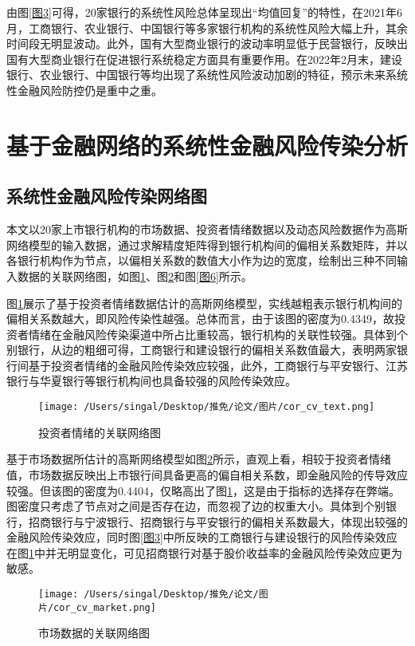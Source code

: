 \documentclass[lang=cn]{elegantpaper}
\begin{document}
由图\ref{图3}可得，20家银行的系统性风险总体呈现出“均值回复”的特性，在2021年6月，工商银行、农业银行、中国银行等多家银行机构的系统性风险大幅上升，其余时间段无明显波动。此外，国有大型商业银行的波动率明显低于民营银行，反映出国有大型商业银行在促进银行系统稳定方面具有重要作用。在2022年2月末，建设银行、农业银行、中国银行等均出现了系统性风险波动加剧的特征，预示未来系统性金融风险防控仍是重中之重。

\section{基于金融网络的系统性金融风险传染分析}
\subsection{系统性金融风险传染网络图}
本文以20家上市银行机构的市场数据、投资者情绪数据以及动态风险数据作为高斯网络模型的输入数据，通过求解精度矩阵得到银行机构间的偏相关系数矩阵，并以各银行机构作为节点，以偏相关系数的数值大小作为边的宽度，绘制出三种不同输入数据的关联网络图，如图\ref{图4}、图\ref{图5}和图\ref{图6}所示。

图\ref{图4}展示了基于投资者情绪数据估计的高斯网络模型，实线越粗表示银行机构间的偏相关系数越大，即风险传染性越强。总体而言，由于该图的密度为0.4349，故投资者情绪在金融风险传染渠道中所占比重较高，银行机构的关联性较强。具体到个别银行，从边的粗细可得，工商银行和建设银行的偏相关系数值最大，表明两家银行间基于投资者情绪的金融风险传染效应较强，此外，工商银行与平安银行、江苏银行与华夏银行等银行机构间也具备较强的风险传染效应。
\begin{figure}[htb]
    \centering
    \texttt{[image: /Users/singal/Desktop/推免/论文/图片/cor\_cv\_text.png]}
    \caption{投资者情绪的关联网络图}
    \label{图4}
\end{figure}

基于市场数据所估计的高斯网络模型如图\ref{图5}所示，直观上看，相较于投资者情绪值，市场数据反映出上市银行间具备更高的偏自相关系数，即金融风险的传导效应较强。但该图的密度为0.4404，仅略高出了图\ref{图4}，这是由于指标的选择存在弊端。图密度只考虑了节点对之间是否存在边，而忽视了边的权重大小。具体到个别银行，招商银行与宁波银行、招商银行与平安银行的偏相关系数最大，体现出较强的金融风险传染效应，同时图\ref{图3}中所反映的工商银行与建设银行的风险传染效应在图\ref{图4}中并无明显变化，可见招商银行对基于股价收益率的金融风险传染效应更为敏感。

\begin{figure}[htb]
    \centering
    \texttt{[image: /Users/singal/Desktop/推免/论文/图片/cor\_cv\_market.png]}
    \caption{市场数据的关联网络图}
    \label{图5}
\end{figure}
\end{document}
